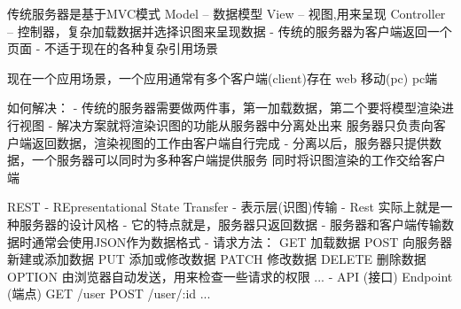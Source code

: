 传统服务器是基于MVC模式
  Model -- 数据模型
  View -- 视图,用来呈现
  Controller -- 控制器，复杂加载数据并选择识图来呈现数据
  - 传统的服务器为客户端返回一个页面
  - 不适于现在的各种复杂引用场景

现在一个应用场景，一个应用通常有多个客户端(client)存在
  web  移动(pc) pc端

如何解决：
  - 传统的服务器需要做两件事，第一加载数据，第二个要将模型渲染进行视图
  - 解决方案就将渲染识图的功能从服务器中分离处出来
      服务器只负责向客户端返回数据，渲染视图的工作由客户端自行完成
  - 分离以后，服务器只提供数据，一个服务器可以同时为多种客户端提供服务
      同时将识图渲染的工作交给客户端

REST
  - REpresentational State Transfer
  - 表示层(识图)传输
  - Rest 实际上就是一种服务器的设计风格
  - 它的特点就是，服务器只返回数据
  - 服务器和客户端传输数据时通常会使用JSON作为数据格式
  - 请求方法：
      GET     加载数据 
      POST    向服务器新建或添加数据
      PUT     添加或修改数据
      PATCH   修改数据
      DELETE  删除数据
      OPTION  由浏览器自动发送，用来检查一些请求的权限
      ...
  - API (接口)  Endpoint (端点)
    GET /user
    POST /user/:id
    ...